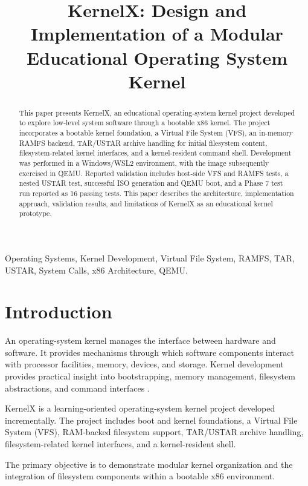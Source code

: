 \documentclass[conference]{IEEEtran}
\title{KernelX: Design and Implementation of a Modular Educational Operating System Kernel}
\author{
\IEEEauthorblockN{Chethana Sri}
\IEEEauthorblockA{
Department of Computer Technology\\
Madras Institute of Technology, Anna University\\
Chennai, India
}
}
\begin{document}
\maketitle

\begin{abstract}
This paper presents KernelX, an educational operating-system
kernel project developed to explore low-level system software
through a bootable x86 kernel. The project incorporates a bootable
kernel foundation, a Virtual File System (VFS), an in-memory
RAMFS backend, TAR/USTAR archive handling for initial filesystem
content, filesystem-related kernel interfaces, and a kernel-resident
command shell. Development was performed in a Windows/WSL2
environment, with the image subsequently exercised in QEMU.
Reported validation includes host-side VFS and RAMFS tests,
a nested USTAR test, successful ISO generation and QEMU boot,
and a Phase 7 test run reported as 16 passing tests. This paper
describes the architecture, implementation approach, validation
results, and limitations of KernelX as an educational kernel
prototype.
\end{abstract}

\begin{IEEEkeywords}
Operating Systems, Kernel Development, Virtual File System,
RAMFS, TAR, USTAR, System Calls, x86 Architecture, QEMU.
\end{IEEEkeywords}

\section{Introduction}

An operating-system kernel manages the interface between
hardware and software. It provides mechanisms through which
software components interact with processor facilities, memory,
devices, and storage. Kernel development provides practical
insight into bootstrapping, memory management, filesystem
abstractions, and command interfaces \cite{tanenbaum,stallings}.

KernelX is a learning-oriented operating-system kernel project
developed incrementally. The project includes boot and kernel
foundations, a Virtual File System (VFS), RAM-backed filesystem
support, TAR/USTAR archive handling, filesystem-related kernel
interfaces, and a kernel-resident shell.

The primary objective is to demonstrate modular kernel
organization and the integration of filesystem components
within a bootable x86 environment.
\end{document}
